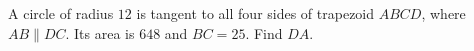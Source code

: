 A circle of radius $12$ is tangent to all four sides of trapezoid $ABCD$, where $AB\parallel DC$. Its area is $648$ and $BC=25$. Find $DA$.
